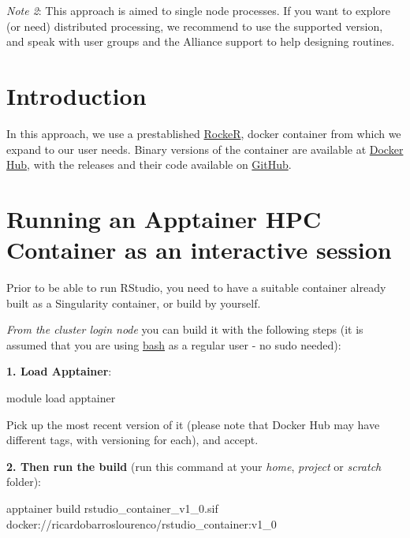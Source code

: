 \documentclass[
]{book}
\newenvironment{Shaded}{\begin{snugshade}}{\end{snugshade}}
\newcommand{\ExtensionTok}[1]{#1}
\newcommand{\NormalTok}[1]{#1}
\begin{document}
\emph{Note 2}: This approach is aimed to single node processes. If you want to
explore (or need) distributed processing, we recommend to use the supported
version, and speak with user groups and the Alliance support to help designing routines.

\hypertarget{introduction-1}{%
\section{Introduction}\label{introduction-1}}

In this approach, we use a prestablished \href{https://rocker-project.org/}{RockeR},
docker container from which we expand to our user needs. Binary versions of the
container are available at \href{https://hub.docker.com/repository/docker/ricardobarroslourenco/rstudio_container/general}{Docker Hub}, with the releases and their code available on \href{https://github.com/MacRemoteSensing/rstudio_container/releases}{GitHub}.

\hypertarget{running-an-apptainer-hpc-container-as-an-interactive-session}{%
\section{Running an Apptainer HPC Container as an interactive session}\label{running-an-apptainer-hpc-container-as-an-interactive-session}}

Prior to be able to run RStudio, you need to have a suitable container already built
as a Singularity container, or build by yourself.

\emph{From the cluster login node} you can build it with the following steps (it is assumed that you are using \href{https://en.wikipedia.org/wiki/Bash_(Unix_shell)}{bash} as a regular user - no sudo needed):

\textbf{1. Load Apptainer}:

\begin{Shaded}
\begin{Highlighting}[]
\ExtensionTok{module}\NormalTok{ load apptainer}
\end{Highlighting}
\end{Shaded}

Pick up the most recent version of it (please note that Docker Hub may have
different tags, with versioning for each), and accept.

\textbf{2. Then run the build} (run this command at your \emph{home}, \emph{project} or \emph{scratch} folder):

\begin{Shaded}
\begin{Highlighting}[]
\ExtensionTok{apptainer}\NormalTok{ build rstudio\_container\_v1\_0.sif docker://ricardobarroslourenco/rstudio\_container:v1\_0}
\end{Highlighting}
\end{Shaded}
\end{document}
